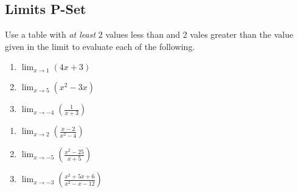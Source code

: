 \documentclass{article}
\newcounter{pset}
\begin{document}
\subsection*{Limits P-Set}

Use a table with \emph{at least} 2 values less than and 2 vales greater than the value given in the limit to evaluate each of the following.
\begin{multicols}{3}
\begin{enumerate}
    \item $\lim_{x \to 1} (4x + 3)$
    \item $\lim_{x \to 5} (x^2-3x)$
    \item $\lim_{x \to -4} \left(\frac{1}{x+3}\right)$
\end{enumerate} \setcounter{pset}{\value{enumi}}
\end{multicols}
\smallskip
\begin{multicols}{3}
\begin{enumerate}   \setcounter{enumi}{\value{pset}}
    \item $\lim_{x \to 2} \left(\frac{x-2}{x^2-4}\right)$
    \item $\lim_{x \to -5} \left(\frac{x^2-25}{x+5}\right)$
    \item $\lim_{x \to -3}  \left(\frac{x^2+5x+6}{x^2-x-12}\right)$
\end{enumerate} \setcounter{pset}{\value{enumi}}
\end{multicols}
\bigskip 
\end{document}
